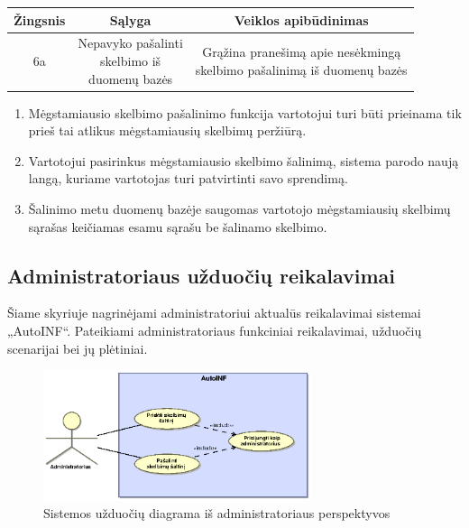 \documentclass[12pt]{article}
\begin{document}
		\begin{center}
		\begin{tabular}{ | c | c | c | }
			\hline
			Žingsnis & Sąlyga & Veiklos apibūdinimas \\ \hline
			6a       & \makecell{Nepavyko pašalinti \\ skelbimo iš \\ duomenų bazės} & \makecell{Grąžina pranešimą apie nesėkmingą \\ skelbimo pašalinimą iš duomenų bazės} \\ \hline
		\end{tabular}
		\end{center}
		\bigskip
		
	\begin{enumerate}[resume,labelindent=10pt,leftmargin=2.2cm]
		\item Mėgstamiausio skelbimo pašalinimo funkcija vartotojui turi būti prieinama tik prieš tai atlikus mėgstamiausių skelbimų peržiūrą.
		\item Vartotojui pasirinkus mėgstamiausio skelbimo šalinimą, sistema parodo naują langą, kuriame vartotojas turi patvirtinti savo sprendimą.
		\item Šalinimo metu duomenų bazėje saugomas vartotojo mėgstamiausių skelbimų sąrašas keičiamas esamu sąrašu be šalinamo skelbimo.
	\end{enumerate}		
	\pagebreak	
	
	\subsection{Administratoriaus užduočių reikalavimai}
	Šiame skyriuje nagrinėjami administratoriui aktualūs reikalavimai sistemai „AutoINF“. Pateikiami administratoriaus funkciniai reikalavimai, užduočių scenarijai bei jų plėtiniai.
	
	\begin{figure}[h]
		\begin{center}
			\includegraphics[width=0.7\textwidth]{TikslaiAdministratorius.eps}
			\caption{Sistemos užduočių diagrama iš administratoriaus perspektyvos\label{UseCaseAdmin}}
		\end{center}
	\end{figure}
	\pagebreak
	
\end{document}
